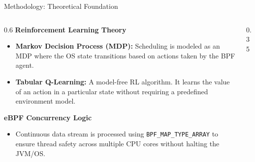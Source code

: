 \documentclass[aspectratio=169]{beamer}
\begin{document}
\begin{frame}{Methodology: Theoretical Foundation}
    \begin{columns}
        \begin{column}{0.6\textwidth}
            \textbf{Reinforcement Learning Theory}
            \begin{itemize}
                \item \textbf{Markov Decision Process (MDP):} Scheduling is modeled as an MDP where the OS state transitions based on actions taken by the BPF agent.
                \item \textbf{Tabular Q-Learning:} A model-free RL algorithm. It learns the value of an action in a particular state without requiring a predefined environment model.
            \end{itemize}
            \vspace{0.3cm}
            \textbf{eBPF Concurrency Logic}
            \begin{itemize}
                \item Continuous data stream is processed using \texttt{BPF\_MAP\_TYPE\_ARRAY} to ensure thread safety across multiple CPU cores without halting the JVM/OS.
            \end{itemize}
        \end{column}
        \begin{column}{0.35\textwidth}
            \centering
        \end{column}
    \end{columns}
\end{frame}
\end{document}
